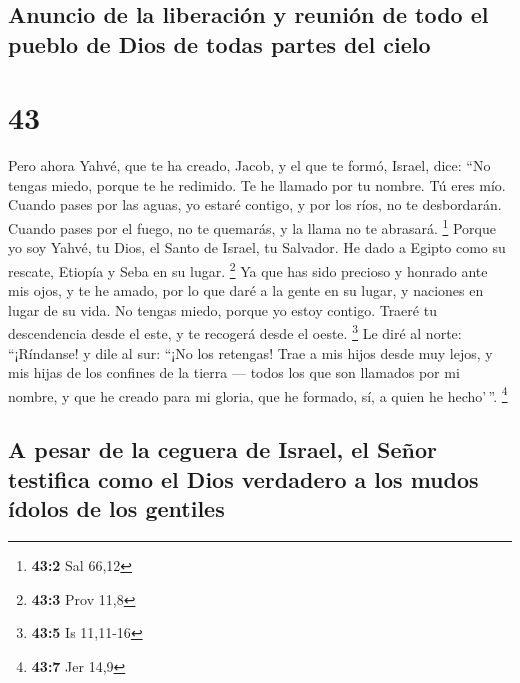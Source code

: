 \hypertarget{anuncio-de-la-liberaciuxf3n-y-reuniuxf3n-de-todo-el-pueblo-de-dios-de-todas-partes-del-cielo}{%
\subsection{Anuncio de la liberación y reunión de todo el pueblo de Dios
de todas partes del
cielo}\label{anuncio-de-la-liberaciuxf3n-y-reuniuxf3n-de-todo-el-pueblo-de-dios-de-todas-partes-del-cielo}}

\hypertarget{section-42}{%
\section{43}\label{section-42}}

 Pero ahora Yahvé, que te ha creado, Jacob, y el que te
formó, Israel, dice: ``No tengas miedo, porque te he redimido. Te he
llamado por tu nombre. Tú eres mío.  Cuando pases por las
aguas, yo estaré contigo, y por los ríos, no te desbordarán. Cuando
pases por el fuego, no te quemarás, y la llama no te abrasará.
\footnote{\textbf{43:2} Sal 66,12}  Porque yo soy Yahvé,
tu Dios, el Santo de Israel, tu Salvador. He dado a Egipto como su
rescate, Etiopía y Seba en su lugar. \footnote{\textbf{43:3} Prov 11,8}
 Ya que has sido precioso y honrado ante mis ojos, y te he
amado, por lo que daré a la gente en su lugar, y naciones en lugar de su
vida.  No tengas miedo, porque yo estoy contigo. Traeré tu
descendencia desde el este, y te recogerá desde el oeste. \footnote{\textbf{43:5}
  Is 11,11-16}  Le diré al norte: ``¡Ríndanse! y dile al
sur: ``¡No los retengas! Trae a mis hijos desde muy lejos, y mis hijas
de los confines de la tierra ---  todos los que son
llamados por mi nombre, y que he creado para mi gloria, que he formado,
sí, a quien he hecho'\,''. \footnote{\textbf{43:7} Jer 14,9}

\hypertarget{a-pesar-de-la-ceguera-de-israel-el-seuxf1or-testifica-como-el-dios-verdadero-a-los-mudos-uxeddolos-de-los-gentiles}{%
\subsection{A pesar de la ceguera de Israel, el Señor testifica como el
Dios verdadero a los mudos ídolos de los
gentiles}\label{a-pesar-de-la-ceguera-de-israel-el-seuxf1or-testifica-como-el-dios-verdadero-a-los-mudos-uxeddolos-de-los-gentiles}}

